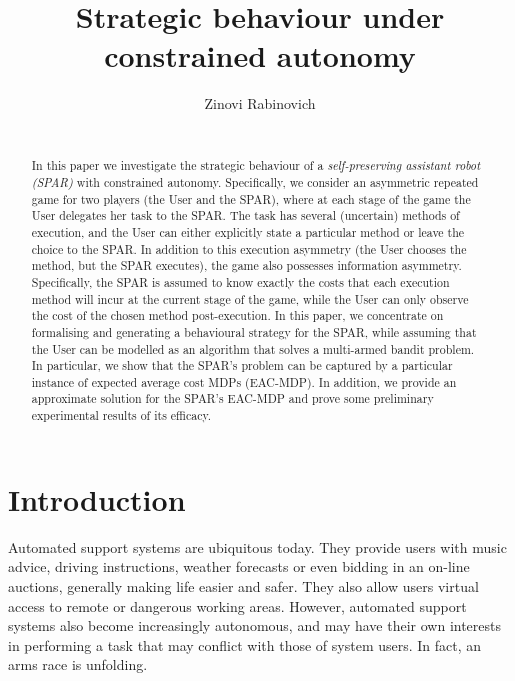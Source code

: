 \documentclass{msdm2012}
\begin{document}
\title{Strategic behaviour under constrained autonomy}

\author{\alignauthor Zinovi Rabinovich\\\\}

\maketitle


\begin{abstract}
In this paper we investigate the strategic behaviour of a {\em
  self-preserving assistant robot (SPAR)} with constrained
autonomy. Specifically, we consider an asymmetric repeated game for
two players (the User and the SPAR), where at each stage of the game
the User delegates her task to the SPAR. The task has several
(uncertain) methods of execution, and the User can either explicitly
state a particular method or leave the choice to the SPAR. In addition
to this execution asymmetry (the User chooses the method, but the SPAR
executes), the game also possesses information
asymmetry. Specifically, the SPAR is assumed to know exactly the costs
that each execution method will incur at the current stage of the
game, while the User can only observe the cost of the chosen method
post-execution. In this paper, we concentrate on formalising and
generating a behavioural strategy for the SPAR, while assuming that
the User can be modelled as an algorithm that solves a multi-armed
bandit problem. In particular, we show that the SPAR's problem can be
captured by a particular instance of expected average cost MDPs
(EAC-MDP). In addition, we provide an approximate solution for the
SPAR's EAC-MDP and prove some preliminary experimental results of its
efficacy.
\end{abstract}

\section{Introduction}\label{intro}
Automated support systems are ubiquitous today. They provide users
with music advice, driving instructions, weather forecasts or even
bidding in an on-line auctions, generally making life easier and
safer. They also allow users virtual access to remote or dangerous
working areas. However, automated support systems also become
increasingly autonomous, and may have their own interests in
performing a task that may conflict with those of system users. In
fact, an arms race is unfolding.
\end{document}
